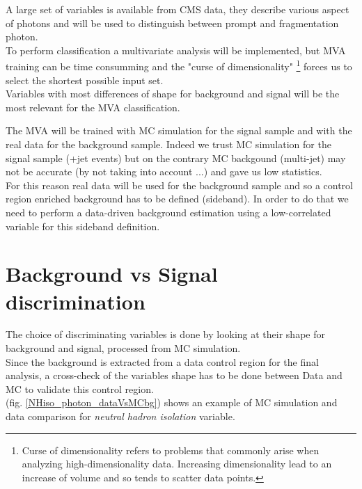 \label{sec:unchapitre}

A large set of variables is available from CMS data, they describe various aspect of photons and will be used to
distinguish between prompt and fragmentation photon.\\
To perform classification a multivariate analysis will be implemented, but MVA training can be time consumming and the "curse of
dimensionality" \footnote{Curse of dimensionality refers to problems that commonly arise when analyzing high-dimensionality data.
Increasing dimensionality lead to an increase of volume and so tends to scatter data points.} forces us to select the shortest possible input set.\\

Variables with most differences of shape for background and signal will be the most relevant for the MVA classification.



The MVA will be trained with MC simulation for the signal sample and with the real data for the background sample. Indeed we trust MC simulation for the signal sample (\textgamma+jet events) but on the contrary MC backgound (multi-jet) may not be accurate (by not taking into account ...) and gave us low statistics.\\
For this reason real data will be used for the background sample and so a control region enriched background has to be defined (sideband).
In order to do that we need to perform a data-driven background estimation using a low-correlated variable for this sideband definition.

\section{Background vs Signal discrimination}

The choice of discriminating variables is done by looking at their shape for background and signal, processed from MC simulation.\\
Since the background is extracted from a data control region for the final analysis, a cross-check of the variables shape has to be done between Data and MC to validate this control region.\\
(fig. \ref{NHiso_photon_dataVsMCbg}) shows an example of MC simulation and data comparison for \emph{neutral hadron isolation} variable. \\

